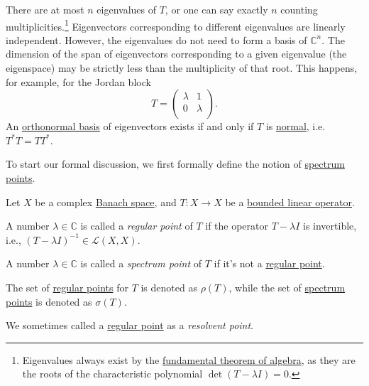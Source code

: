 There are at most \(n\) eigenvalues of \(T\), or one can say exactly \(n\) counting multiplicities.\footnote{Eigenvalues always exist by the \href{https://en.wikipedia.org/wiki/Fundamental_theorem_of_algebra}{fundamental theorem of algebra}, as they are the roots of the characteristic polynomial \(\det(T - \lambda I) = 0 \).} Eigenvectors corresponding to different eigenvalues are linearly independent. However, the eigenvalues do not need to form a basis of \(\mathbb{C} ^n\). The dimension of the span of eigenvectors corresponding to a given eigenvalue (the eigenspace) may be strictly less than the multiplicity of that root. This happens, for example, for the Jordan block
\[
	T = \begin{pmatrix}
		\lambda & 1       \\
		0       & \lambda \\
	\end{pmatrix}.
\]
An \hyperref[def:orthonormal-basis]{orthonormal basis} of eigenvectors exists if and only if \(T\) is \hyperref[def:normal-op]{normal}, i.e. \(T^{\ast} T = TT^{\ast} \).

To start our formal discussion, we first formally define the notion of \hyperref[def:spectrum-point]{spectrum points}.

\begin{definition*}
	Let \(X\) be a complex \hyperref[def:Banach-space]{Banach space}, and \(T\colon X \to X\) be a \hyperref[def:bounded-linear-op]{bounded linear operator}.
	\begin{definition}\label{def:regular-point}
		A number \(\lambda \in \mathbb{C} \) is called a \emph{regular point} of \(T\) if the operator \(T-\lambda I\) is invertible, i.e., \((T-\lambda I)^{-1} \in \mathcal{L} (X, X)\).
	\end{definition}
	\begin{definition}\label{def:spectrum-point}
		A number \(\lambda \in \mathbb{C} \) is called a \emph{spectrum point} of \(T\) if it's not a \hyperref[def:regular-point]{regular point}.
	\end{definition}
\end{definition*}

\begin{notation}
	The set of \hyperref[def:regular-point]{regular points} for \(T\) is denoted as \(\rho (T)\), while the set of \hyperref[def:spectrum-point]{spectrum points} is denoted as \(\sigma (T)\).
\end{notation}

\begin{remark}
	We sometimes called a \hyperref[def:regular-point]{regular point} as a \emph{resolvent point}.
\end{remark}

